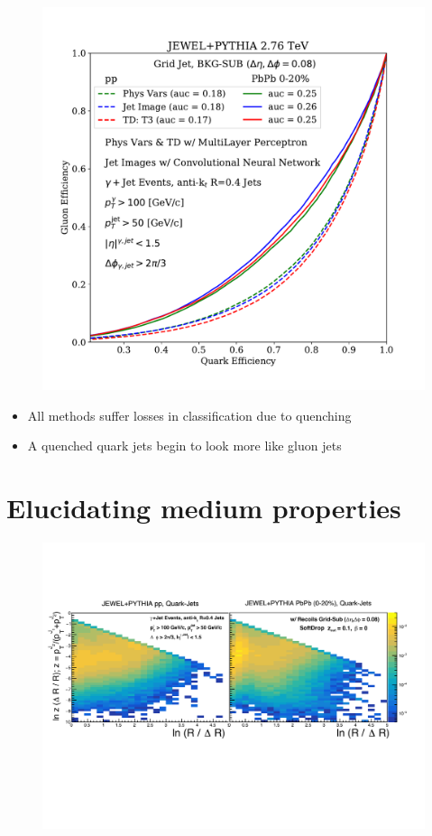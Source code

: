\documentclass[final]{beamer}
\begin{document}
\begin{frame}[t]
\begin{multicols}{3}
	\begin{figure}[h]
	  \centering
	  \includegraphics[width=1.0\columnwidth]{Figures/ROC_QvsG_v2.pdf}
	  \label{fig:tjetQCD}
	\end{figure}
	
	\begin{itemize}
	\item All methods suffer losses in classification due to quenching
	\item A quenched quark jets begin to look more like gluon jets 
	\end{itemize}
	

\section{Elucidating medium properties}

	\begin{figure}[t]
	   \centering
	   \includegraphics[width=0.9\columnwidth]{Figures/lunddiagram_edit}
	   \label{fig:lunddiagram_qjet}
	\end{figure}


\end{multicols}
\end{frame}
\end{document}
